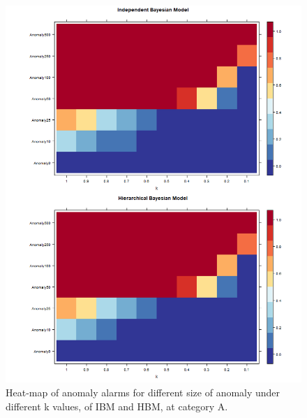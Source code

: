 \newpage

\begin{figure}[!h]
	\centering
	\includegraphics[width=1\linewidth]{../../R-codes/JAGS/plots/sim1/heatA}
	\caption{Heat-map of anomaly alarms for different size of anomaly under different k values, of IBM and HBM, at category A.}
	\label{fig:heatAab}
\end{figure}

\newpage

